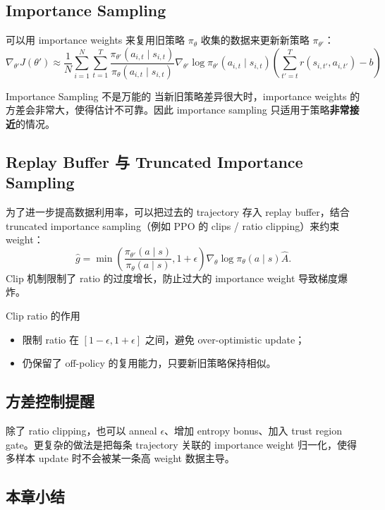 \documentclass[a4paper]{article}
\begin{document}
\subsection{Importance Sampling}

可以用 importance weights 来复用旧策略 $\pi_\theta$ 收集的数据来更新新策略 $\pi_{\theta'}$：
$$\nabla_{\theta'} J(\theta') \approx \frac{1}{N}\sum_{i=1}^{N}\sum_{t=1}^{T} \frac{\pi_{\theta'}(a_{i,t} \mid s_{i,t})}{\pi_\theta(a_{i,t} \mid s_{i,t})} \nabla_{\theta'} \log \pi_{\theta'}(a_{i,t} \mid s_{i,t}) \left(\sum_{t'=t}^{T} r(s_{i,t'}, a_{i,t'}) - b\right)$$

\begin{warningbox}{Importance Sampling 不是万能的}
当新旧策略差异很大时，importance weights 的方差会非常大，使得估计不可靠。因此 importance sampling 只适用于策略\textbf{非常接近}的情况。
\end{warningbox}

\subsection{Replay Buffer 与 Truncated Importance Sampling}
为了进一步提高数据利用率，可以把过去的 trajectory 存入 replay buffer，结合 truncated importance sampling（例如 PPO 的 clips / ratio clipping）来约束 weight：
$$\hat{g} = \min\left(\frac{\pi_{\theta'}(a\mid s)}{\pi_\theta(a\mid s)}, 1+\epsilon\right) \nabla_\theta \log \pi_\theta(a\mid s) \hat{A}.$$
Clip 机制限制了 ratio 的过度增长，防止过大的 importance weight 导致梯度爆炸。

\begin{importantbox}{Clip ratio 的作用}
\begin{itemize}
    \item 限制 ratio 在 $[1-\epsilon,1+\epsilon]$ 之间，避免 over-optimistic update；
    \item 仍保留了 off-policy 的复用能力，只要新旧策略保持相似。
\end{itemize}
\end{importantbox}

\subsection{方差控制提醒}
除了 ratio clipping，也可以 anneal $\epsilon$、增加 entropy bonus、加入 trust region gate。更复杂的做法是把每条 trajectory 关联的 importance weight 归一化，使得多样本 update 时不会被某一条高 weight 数据主导。

\subsection{本章小结}
\end{document}

